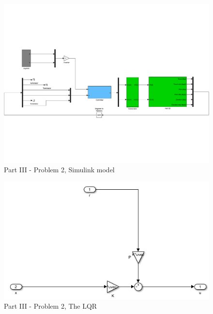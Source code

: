 \begin{figure}[htb]
	\centering
		\includegraphics[width=\textwidth]{models/P3p2.pdf}
	\caption{Part III - Problem 2, Simulink model}
\label{fig:P3p2}
\end{figure}

\begin{figure}[htb]
	\centering
		\includegraphics[width=\textwidth]{models/P3p2_LQR.PNG}
	\caption{Part III - Problem 2, The LQR}
\label{fig:P3p2_LQR}
\end{figure}

